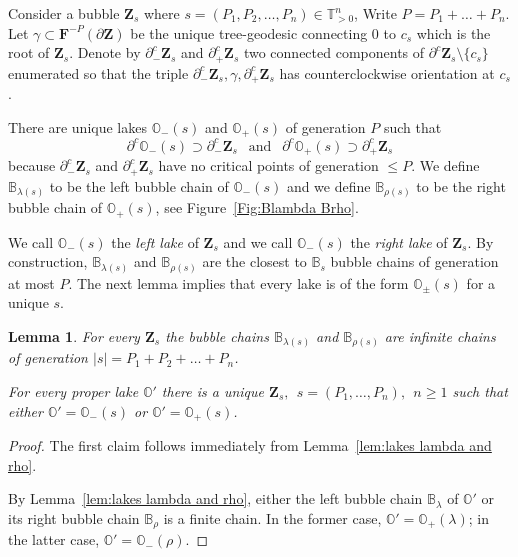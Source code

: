 \documentclass{amsart}
\renewcommand{\sp}{{\ \ }}
\newcommand{\1}{{\mathbb 1 }}
\newcommand\PT{\mathbb{ T}}
\newcommand{\bB}{{\mathbb{B}}}
\newcommand{\bO}{{\mathbb{O}}}
\newcommand{\bF}{{\mathbf F}}
\newcommand{\bZ}{{\mathbf Z}}
\newtheorem{lem}[thm]{Lemma}
\theoremstyle{remark}
\numberwithin{equation}{section}
\theoremstyle{definition}
\theoremstyle{nonumberbreak}
\begin{document}
Consider a bubble $\bZ_s$ where $s=(P_1,P_2,\dots , P_n)\in  \PT^n_{>0}$, Write $P=P_1+\dots +P_n$. Let $\gamma\subset \bF^{-P}(\partial \bZ)$ be the unique tree-geodesic connecting $0$ to $c_{s}$ which is the root of $\bZ_s$. Denote by $\partial ^c_- \bZ_s$ and $\partial ^c_+ \bZ_s$ two connected components of $\partial ^c \bZ_s\setminus \{c_s\}$ enumerated so that the triple $\partial ^c_- \bZ_s,\gamma, \partial ^c_+ \bZ_s$ has counterclockwise orientation at $c_s$.

There are unique lakes $\bO_-(s)$ and $\bO_+(s)$ of generation $P$ such that \[\partial^c\bO_{-}(s)\supset \partial ^c_- \bZ_s\sp \text{ and }\sp \partial^c\bO_{+}(s)\supset \partial ^c_+ \bZ_s\] because $\partial ^c_- \bZ_s$ and $\partial ^c_+ \bZ_s$ have no critical points of generation $\le P$. We define $\bB_{\lambda(s)}$ to be the left bubble chain of $\bO_-(s)$ and we define $\bB_{\rho(s)}$ to be the right bubble chain of $\bO_+(s)$, see Figure~\ref{Fig:Blambda Brho}.

We call $\bO_{-}(s)$ the \emph{left lake} of $\bZ_s$ and we call $\bO_{-}(s)$ the \emph{right lake} of $\bZ_s$. By construction, $\bB_{\lambda(s)}$ and $\bB_{\rho(s)}$ are the closest to $\bB_s$ bubble chains of generation at most $P$. The next lemma implies that every lake is of the form $\bO_\pm(s)$ for a unique $s$.


\begin{lem}
\label{lem:closest BChains}
For every $\bZ_s$ the bubble chains $\bB_{\lambda(s)}$ and $\bB_{\rho(s)}$ are infinite chains of generation $|s|=P_1+P_2+\dots+P_n$.

For every proper lake $\bO'$ there is a unique $\bZ_s,\sp s=(P_1,\dots ,P_n),\sp n\ge1$ such that either $\bO'=\bO_-(s)$ or $\bO'=\bO_+(s)$.
\end{lem}
\begin{proof}
The first claim follows immediately from Lemma~\ref{lem:lakes lambda and rho}. 

By Lemma~\ref{lem:lakes lambda and rho}, either the left bubble chain $\bB_\lambda$ of $\bO'$ or its right bubble chain $\bB_\rho$ is a finite chain. In the former case, $\bO'=\bO_+(\lambda)$; in the latter case, $\bO'=\bO_-(\rho)$.
\end{proof}
\end{document}

